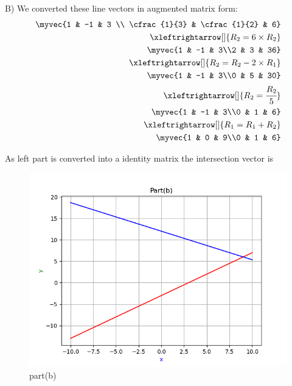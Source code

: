 \begin{enumerate}[label=\thesection.\arabic*.,ref=\thesection.\theenumi]
B)
We converted these line vectors in augmented matrix form:\\ 

\begin{align*}
    \myvec{1 & -1 & 3 \\ \cfrac{1}{3} & \cfrac{1}{2} & 6}
\\
    \xleftrightarrow[]{R_{2}=6\times R_{2}}
\\
    \myvec{1 & -1 & 3\\2 & 3 & 36}
\\
    \xleftrightarrow[]{R_{2}=R_{2}-2\times R_{1}}
\\
    \myvec{1 & -1 & 3\\0 & 5 & 30}
\\
    \xleftrightarrow[]{R_{2}=\cfrac{R_{2}}{5}}
\\
    \myvec{1 & -1 & 3\\0 & 1 & 6}
\\
    \xleftrightarrow[]{R_{1}=R_{1}+R_{2}}
\\
    \myvec{1 & 0 & 9\\0 & 1 & 6}
\end{align*}

As left part is converted into a identity matrix the intersection vector is \\

\renewcommand{\thefigure}{\theenumi.\arabic{figure}}
\begin{figure}[!ht]
    \centering
    \includegraphics[width=\columnwidth]{./figures/A1_partb}
\caption{part(b)}
\label{fig: part(b)}
\end{figure}


\end{enumerate}
